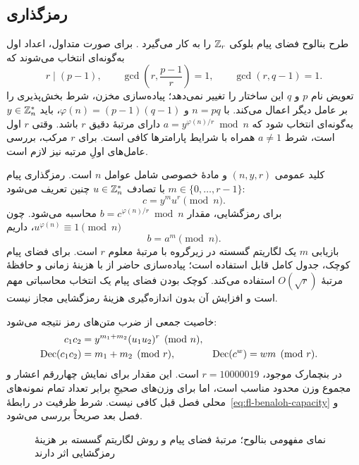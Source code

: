 \subsection{رمزگذاری }
طرح بنالوح فضای پیام بلوکی $\mathbb{Z}_r$ را به کار می‌گیرد \cite{ref180}. برای صورت متداول، اعداد اول به‌گونه‌ای انتخاب می‌شوند که
\begin{equation}
r\mid(p-1),\qquad \gcd\left(r,\frac{p-1}{r}\right)=1,
\qquad \gcd(r,q-1)=1.
\end{equation}
تعویض نام $p$ و $q$ این ساختار را تغییر نمی‌دهد؛ پیاده‌سازی مخزن، شرط بخش‌پذیری را بر عامل دیگر اعمال می‌کند. با $n=pq$ و $\varphi(n)=(p-1)(q-1)$، باید $y\in\mathbb{Z}_n^*$ به‌گونه‌ای انتخاب شود که $a=y^{\varphi(n)/r}\bmod n$ دارای مرتبۀ دقیق $r$ باشد. وقتی $r$ اول است، شرط $a\ne1$ همراه با شرایط پارامترها کافی است. برای $r$ مرکب، بررسی عامل‌های اولِ مرتبه نیز لازم است.

کلید عمومی $(n,y,r)$ و مادۀ خصوصی شامل عوامل $n$ است. رمزگذاری پیام $m\in\{0,\ldots,r-1\}$ با تصادف $u\in\mathbb{Z}_n^*$ چنین تعریف می‌شود:
\begin{equation}
c=y^m u^r\pmod n.
\label{eq:benaloh}
\end{equation}
برای رمزگشایی، مقدار $b=c^{\varphi(n)/r}\bmod n$ محاسبه می‌شود. چون $u^{\varphi(n)}\equiv1\pmod n$، داریم
\begin{equation}
b=a^m\pmod n.
\label{eq:benaloh-log}
\end{equation}
بازیابی $m$ یک لگاریتم گسسته در زیرگروه با مرتبۀ معلوم $r$ است. برای فضای پیام کوچک، جدول کامل قابل استفاده است؛ پیاده‌سازی حاضر از  با هزینۀ زمانی و حافظۀ مرتبۀ $O(\sqrt r)$ استفاده می‌کند. کوچک بودن فضای پیام یک انتخاب محاسباتی مهم است و افزایش آن بدون اندازه‌گیری هزینۀ رمزگشایی مجاز نیست.

خاصیت جمعی از ضرب متن‌های رمز نتیجه می‌شود:
\begin{align}
c_1c_2&=y^{m_1+m_2}(u_1u_2)^r\pmod n,\\
\operatorname{Dec}(c_1c_2)&=m_1+m_2\pmod r,&
\operatorname{Dec}(c^w)&=wm\pmod r.
\label{eq:benaloh-homomorphism}
\end{align}
در بنچمارک موجود، $r=10000019$ است. این مقدار برای نمایش چهاررقم اعشار و مجموع وزن محدود مناسب است، اما برای وزن‌های صحیحِ برابر تعداد تمام نمونه‌های محلی فصل قبل کافی نیست. شرط ظرفیت در رابطۀ~\eqref{eq:fl-benaloh-capacity} و فصل بعد صریحاً بررسی می‌شود.
\begin{figure}[htbp]
\centering
\caption{نمای مفهومی بنالوح؛ مرتبۀ فضای پیام و روش لگاریتم گسسته بر هزینۀ رمزگشایی اثر دارند}
\label{fig:benaloh}
\end{figure}

